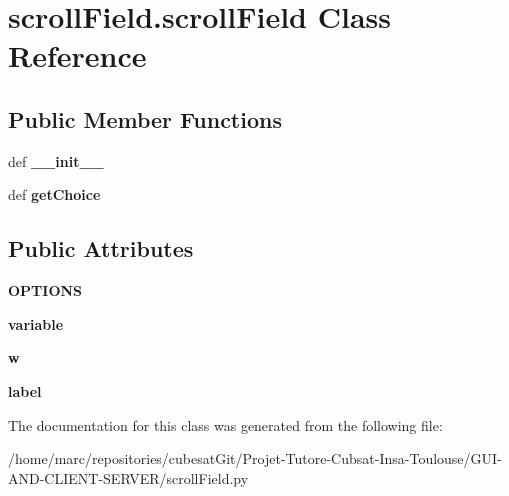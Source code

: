 \hypertarget{classscrollField_1_1scrollField}{\section{scroll\+Field.\+scroll\+Field Class Reference}
\label{classscrollField_1_1scrollField}
}
\subsection*{Public Member Functions}
\begin{DoxyCompactItemize}
\item 
\hypertarget{classscrollField_1_1scrollField_ae07d6427089fde2891d86ff67eb1cdae}{def {\bfseries \+\_\+\+\_\+init\+\_\+\+\_\+}}\label{classscrollField_1_1scrollField_ae07d6427089fde2891d86ff67eb1cdae}

\item 
\hypertarget{classscrollField_1_1scrollField_ade80cb73c1b7904838b4f66209c394fd}{def {\bfseries get\+Choice}}\label{classscrollField_1_1scrollField_ade80cb73c1b7904838b4f66209c394fd}

\end{DoxyCompactItemize}
\subsection*{Public Attributes}
\begin{DoxyCompactItemize}
\item 
\hypertarget{classscrollField_1_1scrollField_a2147f2f7198da88b253c7222da03a6ae}{{\bfseries O\+P\+T\+I\+O\+N\+S}}\label{classscrollField_1_1scrollField_a2147f2f7198da88b253c7222da03a6ae}

\item 
\hypertarget{classscrollField_1_1scrollField_a426b4adaa2711ecfbc6686f9ce08e4ec}{{\bfseries variable}}\label{classscrollField_1_1scrollField_a426b4adaa2711ecfbc6686f9ce08e4ec}

\item 
\hypertarget{classscrollField_1_1scrollField_a62d41efd4e2d4ad7198315416dae324c}{{\bfseries w}}\label{classscrollField_1_1scrollField_a62d41efd4e2d4ad7198315416dae324c}

\item 
\hypertarget{classscrollField_1_1scrollField_a6892d1aecee65721db69fdfa73e388a6}{{\bfseries label}}\label{classscrollField_1_1scrollField_a6892d1aecee65721db69fdfa73e388a6}

\end{DoxyCompactItemize}


The documentation for this class was generated from the following file\+:\begin{DoxyCompactItemize}
\item 
/home/marc/repositories/cubesat\+Git/\+Projet-\/\+Tutore-\/\+Cubsat-\/\+Insa-\/\+Toulouse/\+G\+U\+I-\/\+A\+N\+D-\/\+C\+L\+I\+E\+N\+T-\/\+S\+E\+R\+V\+E\+R/scroll\+Field.\+py\end{DoxyCompactItemize}
